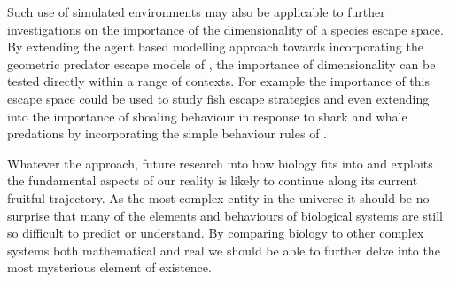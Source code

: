 Such use of simulated environments may also be applicable to further investigations on the importance of the dimensionality of a species escape space. By extending the agent based modelling approach towards incorporating the geometric predator escape models of \cite{howland1974optimal}, the importance of dimensionality can be tested directly within a range of contexts. For example the importance of this escape space could be used to study fish escape strategies \citep{domenici1997kinematics} and even extending into the importance of shoaling behaviour in response to shark and whale predations by incorporating the simple behaviour rules of \cite{couzin2002collective}.


Whatever the approach, future research into how biology fits into and exploits the fundamental aspects of our reality is likely to continue along its current fruitful trajectory. As the most complex entity in the universe it should be no surprise that many of the elements and behaviours of biological systems are still so difficult to predict or understand. By comparing biology to other complex systems both mathematical and real we should be able to further delve into the most mysterious element of existence.









